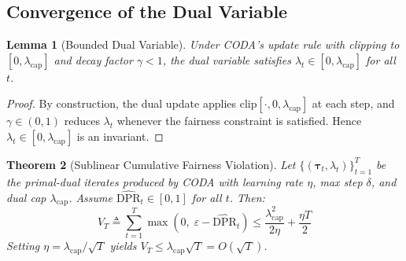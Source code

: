 \documentclass[letterpaper]{article} %
\newtheorem{theorem}{Theorem}
\newtheorem{lemma}[theorem]{Lemma}
\theoremstyle{definition}
\begin{document}
\subsection{Convergence of the Dual Variable}

\begin{lemma}[Bounded Dual Variable]
\label{lemma:bounded_dual}
Under CODA's update rule with clipping to $[0, \lambda_{\text{cap}}]$ and decay factor $\gamma < 1$, the dual variable satisfies $\lambda_t \in [0, \lambda_{\text{cap}}]$ for all $t$.
\end{lemma}
\begin{proof}
By construction, the dual update applies $\text{clip}[\cdot, 0, \lambda_{\text{cap}}]$ at each step, and $\gamma \in (0,1)$ reduces $\lambda_t$ whenever the fairness constraint is satisfied. Hence $\lambda_t \in [0, \lambda_{\text{cap}}]$ is an invariant.
\end{proof}

\begin{theorem}[Sublinear Cumulative Fairness Violation]
\label{thm:convergence}
Let $\{(\boldsymbol{\tau}_t, \lambda_t)\}_{t=1}^T$ be the primal-dual iterates produced by CODA with learning rate $\eta$, max step $\delta$, and dual cap $\lambda_{\text{cap}}$. Assume $\widehat{\text{DPR}}_t \in [0,1]$ for all $t$. Then:
\begin{equation}
V_T \triangleq \sum_{t=1}^T \max\left(0, \; \varepsilon - \widehat{\text{DPR}}_t\right) \leq \frac{\lambda_{\text{cap}}^2}{2\eta} + \frac{\eta T}{2}
\label{eq:violation_bound}
\end{equation}
Setting $\eta = \lambda_{\text{cap}} / \sqrt{T}$ yields $V_T \leq \lambda_{\text{cap}}\sqrt{T} = O(\sqrt{T})$.
\end{theorem}
\end{document}
